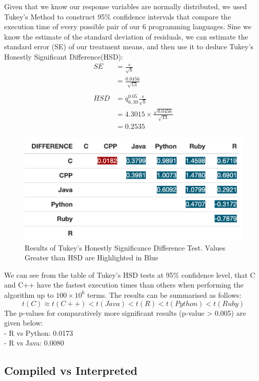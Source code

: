 \documentclass[12pt,halfline,a4paper,]{ouparticle}
\begin{document}
Given that we know our response variables are normally distributed, we
used Tukey's Method to construct 95\% confidence intervals that compare
the execution time of every possible pair of our 6 programming
languages. Sine we know the estimate of the standard deviation of
residuals, we can estimate the standard error (SE) of our treatment
means, and then use it to deduce Tukey's Honestly Significant
Difference(HSD): \[
\begin{aligned}
SE &= \frac{s}{\sqrt{b}}\\
&= \frac{0.0456}{\sqrt{13}}\\\\
HSD &= q_{6,30}^{0.05} \frac{s}{\sqrt{b}}\\
&= 4.3015 \times \frac{\sqrt{0.0456}}{\sqrt{13}}\\
&= 0.2535
\end{aligned}
\]

\begin{figure}[H]
\includegraphics[width=1\linewidth]{skeleton_files/table_tukey} \caption{Results of Tukey's Honestly Significance Difference Test. Values Greater than HSD are Highlighted in Blue}\label{fig:tableTukey}
\end{figure}

We can see from the table of Tukey's HSD tests at 95\% confidence level,
that C and C++ have the fastest execution times than others when
performing the algorithm up to \(100 \times 10^6\) terms. The results
can be summarised as follows: \[
t(C) \approx t(C++) < t(Java) < t(R) < t(Python) < t(Ruby)
\] The p-values for comparatively more significant results (p-value
\textgreater{} 0.005) are given below:\\
- R vs Python: 0.0173\\
- R vs Java: 0.0080

\hypertarget{compiled-vs-interpreted}{%
\subsection{Compiled vs Interpreted}\label{compiled-vs-interpreted}}
\end{document}
